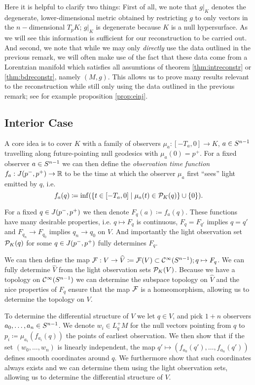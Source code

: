 Here it is helpful to clarify two things: First of all, we note that $g\rvert_K$ denotes the degenerate, lower-dimensional metric obtained by restricting $g$ to only vectors in the $n-$dimensional $T_pK$; $g\rvert_K$ is degenerate because $K$ is a null hypersurface. As we will see this information is sufficient for our reconstruction to be carried out.
And second, we note that while we may only \emph{directly} use the data outlined in the previous remark, we will often make use of the fact that these data come from a Lorentzian manifold which satisfies all assumtions of theorem \ref{thm:intreconstr} or \ref{thm:bdreconstr}, namely $(M,g)$. This allows us to prove many results relevant to the reconstruction while still only using the data outlined in the previous remark; see for example proposition \ref{prop:einj}.

\subsection{Interior Case}
A core idea is to cover $K$ with a family of observers $\mu_a:[-T_a,0]\to K$, $a\in {S^{n-1}}$ travelling along future-pointing null geodesics with $\mu_a(0)=p^+$. For a fixed observer $a\in {S^{n-1}}$ we can then define the \emph{observation time function} $f_a:J(p^-,p^+)\to \mathbb{R}$ to be the time at which the observer $\mu_a$ first \enquote{sees} light emitted by $q$, i.e. 
\[
    f_a(q)\coloneqq \inf (\{t\in [-T_a,0] \mid \mu_a(t)\in {\mathcal{P}}_K(q)\}\cup \{0\}).
\]

For a fixed $q\in J(p^-,p^+)$ we then denote $F_q(a)\coloneqq f_a(q)$. These functions have many desirable properties, i.e. $q\mapsto F_q$ is continuous, $F_q=F_{q'}$ implies $q=q'$ and $F_{q_n}\to F_{q_0}$ implies $q_n\to q_0$ on $V$.
And importantly the light observation set ${\mathcal{P}}_K(q)$ for some $q\in J(p^-,p^+)$ fully determines $F_q$. 

We can then define the map $\mathcal{F}:V\to \widehat{V}\coloneqq \mathcal{F}(V)\subset {\mathcal{C}}^\infty({S^{n-1}}); q\mapsto F_q$. We can fully determine $\widehat{V}$ from the light observation sets ${\mathcal{P}}_K(V)$. Because we have a topology on ${\mathcal{C}}^\infty({S^{n-1}})$ we can determine the subspace topology on $\widehat{V}$ and the nice properties of $F_q$ ensure that the map $\mathcal{F}$ is a homeomorphism, allowing us to determine the topology on $V$.

To determine the differential structure of $V$ we let $q\in V$, and pick $1+n$ observers $a_0,\dots,a_n\in {S^{n-1}}$. We denote $w_i\in L^+_qM$ for the null vectors pointing from $q$ to $p_i\coloneqq \mu_{a_i}(f_{a_i}(q))$ the points of earliest observation. We then show that if the set $(w_0,\dots, w_n)$ is linearly independent, the map $q'\mapsto (f_{a_0}(q'),\dots, f_{a_n}(q'))$ defines smooth coordinates around $q$. We furthermore show that such coordinates always exists and we can determine them using the light observation sets, allowing us to determine the differential structure of $V$.

